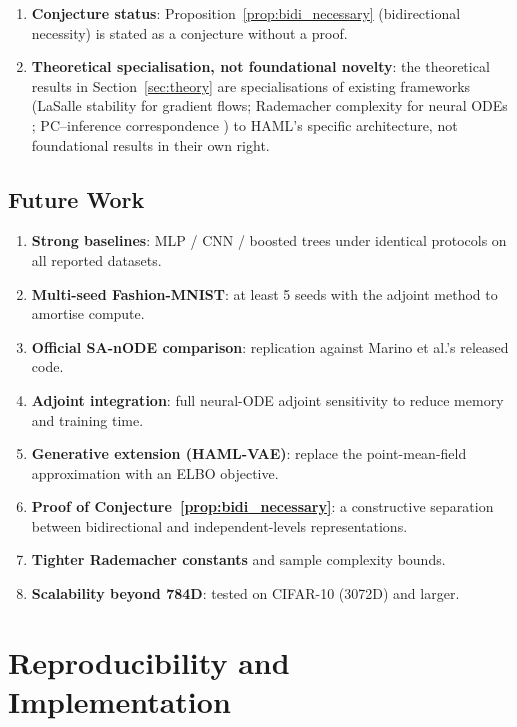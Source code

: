 \documentclass[11pt,a4paper]{article}
\begin{document}
\begin{enumerate}
        explanation.
  \item \textbf{Conjecture status}: Proposition~\ref{prop:bidi_necessary} (bidirectional
        necessity) is stated as a conjecture without a proof.
  \item \textbf{Theoretical specialisation, not foundational novelty}: the theoretical
        results in Section~\ref{sec:theory} are specialisations of existing frameworks
        (LaSalle stability for gradient flows; Rademacher complexity for neural ODEs
        \cite{hanson2024rademacher,marion2023generalization}; PC--inference
        correspondence \cite{whittington2017approximation,song2020can,salvatori2021exactbp})
        to HAML's specific architecture, not foundational results in their own right.
\end{enumerate}

\subsection{Future Work}
\label{sec:future}

\begin{enumerate}
  \item \textbf{Strong baselines}: MLP / CNN / boosted trees under identical protocols on
        all reported datasets.
  \item \textbf{Multi-seed Fashion-MNIST}: at least 5 seeds with the adjoint method to
        amortise compute.
  \item \textbf{Official SA-nODE comparison}: replication against Marino et al.'s released
        code.
  \item \textbf{Adjoint integration}: full neural-ODE adjoint sensitivity to reduce
        memory and training time.
  \item \textbf{Generative extension (HAML-VAE)}: replace the point-mean-field
        approximation with an ELBO objective.
  \item \textbf{Proof of Conjecture~\ref{prop:bidi_necessary}}: a constructive separation
        between bidirectional and independent-levels representations.
  \item \textbf{Tighter Rademacher constants} and sample complexity bounds.
  \item \textbf{Scalability beyond 784D}: tested on CIFAR-10 (3072D) and larger.
\end{enumerate}

\section{Reproducibility and Implementation}
\end{document}
